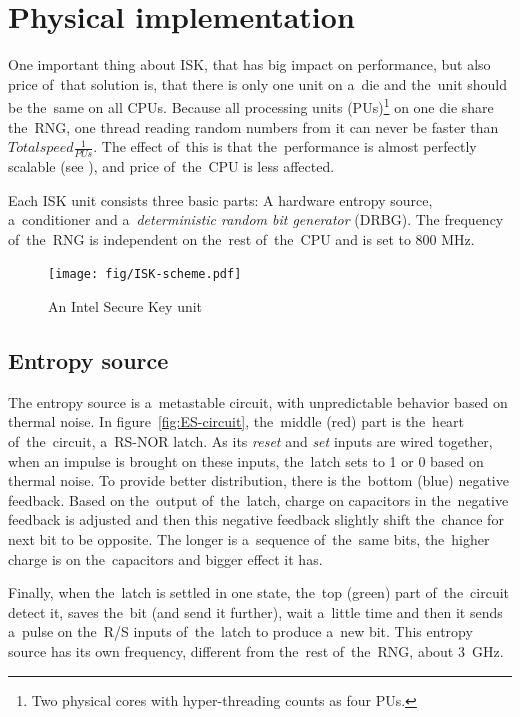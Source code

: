 \section{Physical implementation}\label{sec:ISK-physical}
One important thing about ISK, that has big impact on performance, but also price of~that solution is, that there is only one unit on a~die and the~unit should be the~same on all CPUs. %
Because all processing units (PUs)\footnote{Two physical cores with hyper-threading counts as four PUs.} on one die share the~RNG, one thread reading random numbers from it can never be faster than $Total speed  \frac{1}{PUs}$. The effect of~this is that the~performance is almost perfectly scalable (see ), and price of~the~CPU is less affected.

Each ISK unit consists three basic parts: A hardware entropy source, a~conditioner and a~{\em deterministic random bit generator} (DRBG)\cite{IntelDRNGGuide}. The frequency of~the~RNG is independent on the~rest of~the~CPU and is set to 800 MHz. 
\begin{figure}[h!]
  \centering
 \texttt{[image: fig/ISK-scheme.pdf]} %
\caption{An Intel Secure Key unit}
\label{fig:ISK-unit}
\end{figure}


\subsection{Entropy source}

The entropy source is a~metastable circuit, with unpredictable behavior based 
on thermal noise\cite{UnderstandingRdRandElectronic}. 
In figure~\ref{fig:ES-circuit}, the~middle (red) part is the~heart 
of~the~circuit, a~RS-NOR latch. As its {\em reset} and {\em set} inputs 
are wired together, when an impulse is brought on these inputs, the~latch sets 
to 1 or 0 based on thermal noise. To provide better distribution, there is 
the~bottom (blue) negative feedback. Based on the~output of~the~latch, charge 
on capacitors in the~negative feedback is adjusted and then this negative 
feedback slightly shift the~chance for next bit to be opposite. The longer 
is a~sequence of~the~same bits, the~higher charge is on the~capacitors 
and bigger effect it has.

Finally, when the~latch is settled in one state, the~top (green) part 
of~the~circuit detect it, saves the~bit (and send it further), wait 
a~little time and then it sends a~pulse on the~R/S inputs of~the~latch 
to produce a~new bit. This entropy source has its own frequency, different 
from the~rest of~the~RNG, about 3~GHz.

